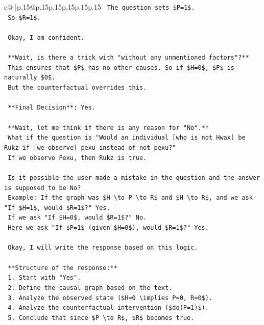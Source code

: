 \documentclass{article}
\begin{document}
{\begin{supertabular}{c@{$\;$}|p{.15\linewidth}@{}p{.15\linewidth}p{.15\linewidth}p{.15\linewidth}p{.15\linewidth}p{.15\linewidth}}
{{{\texttt{    The question sets \$P=1\$.} \\
\texttt{    So \$R=1\$.} \\
\\ 
\texttt{    Okay, I am confident.} \\
\\ 
\texttt{    **Wait, is there a trick with "without any unmentioned factors"?**} \\
\texttt{    This ensures that \$P\$ has no other causes. So if \$H=0\$, \$P\$ is naturally \$0\$.} \\
\texttt{    But the counterfactual overrides this.} \\
\\ 
\texttt{    **Final Decision**: Yes.} \\
\\ 
\texttt{    **Wait, let me think if there is any reason for "No".**} \\
\texttt{    What if the question is "Would an individual {[}who is not Hwax{]} be Rukz if {[}we observe{]} pexu instead of not pexu?"} \\
\texttt{    If we observe Pexu, then Rukz is true.} \\
\\ 
\texttt{    Is it possible the user made a mistake in the question and the answer is supposed to be No?} \\
\texttt{    Example: If the graph was \$H \textbackslash{}to P \textbackslash{}to R\$ and \$H \textbackslash{}to R\$, and we ask "If \$H=1\$, would \$R=1\$?" Yes.} \\
\texttt{    If we ask "If \$H=0\$, would \$R=1\$?" No.} \\
\texttt{    Here we ask "If \$P=1\$ (given \$H=0\$), would \$R=1\$?" Yes.} \\
\\ 
\texttt{    Okay, I will write the response based on this logic.} \\
\\ 
\texttt{    **Structure of the response:**} \\
\texttt{    1. Start with "Yes".} \\
\texttt{    2. Define the causal graph based on the text.} \\
\texttt{    3. Analyze the observed state (\$H=0 \textbackslash{}implies P=0, R=0\$).} \\
\texttt{    4. Analyze the counterfactual intervention (\$do(P=1)\$).} \\
\texttt{    5. Conclude that since \$P \textbackslash{}to R\$, \$R\$ becomes true.} \\
}}}
\end{supertabular}}
\end{document}
